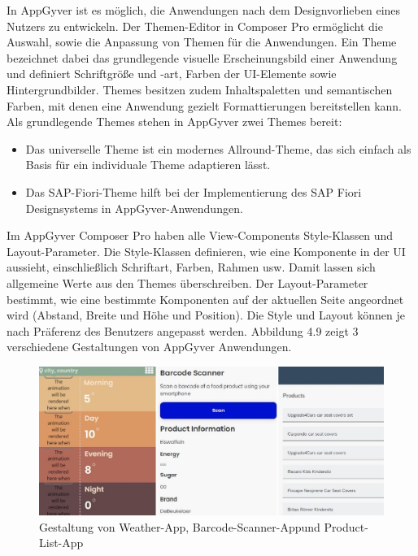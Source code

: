 In AppGyver ist es möglich, die Anwendungen nach dem Designvorlieben eines Nutzers zu entwickeln. Der Themen-Editor in Composer Pro ermöglicht die Auswahl, sowie die Anpassung von Themen für die Anwendungen. Ein Theme bezeichnet dabei das grundlegende visuelle Erscheinungsbild einer Anwendung und definiert Schriftgröße und -art, Farben der UI-Elemente sowie Hintergrundbilder\cite{hel:the}. Themes besitzen zudem Inhaltspaletten und semantischen Farben, mit denen eine Anwendung gezielt Formattierungen bereitstellen kann\cite{appg:the}. Als grundlegende Themes stehen in AppGyver zwei Themes bereit: 

\begin{itemize}[noitemsep]
\item Das universelle Theme ist ein modernes Allround-Theme, das sich einfach als Basis für ein individuale Theme adaptieren lässt.
\item Das SAP-Fiori-Theme hilft bei der Implementierung des SAP Fiori Designsystems in AppGyver-Anwendungen\cite{har:new}.
\end{itemize}

Im AppGyver Composer Pro haben alle View-Components Style-Klassen und Layout-Parameter. Die Style-Klassen definieren, wie eine Komponente in der UI aussieht, einschließlich Schriftart, Farben, Rahmen usw. Damit lassen sich allgemeine Werte aus den Themes überschreiben. Der Layout-Parameter bestimmt, wie eine bestimmte Komponenten auf der aktuellen Seite angeordnet wird (Abstand, Breite und Höhe und Position). Die Style und Layout können je nach Präferenz des Benutzers angepasst werden. Abbildung 4.9 zeigt 3 verschiedene Gestaltungen von AppGyver Anwendungen.

\begin{figure}[htbp]
 \centering
 \includegraphics[width=1.0\textwidth]{Bilder/appgyver/4_9_1_gestaltung.jpg}
 \caption[1]{Gestaltung von Weather-App, Barcode-Scanner-App\footnotemark und Product-List-App\footnotemark }
\end{figure}
\addtocounter{footnote}{-1}

